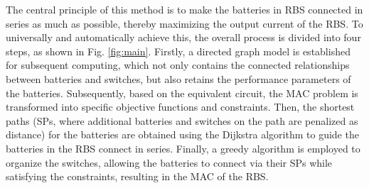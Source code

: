 \documentclass{article}
\begin{document}
The central principle of this method is to make the batteries in RBS connected in series as much as possible, thereby maximizing the output current of the RBS.
To universally and automatically achieve this, the overall process is divided into four steps, as shown in Fig. \ref{fig:main}.
Firstly, a directed graph model is established for subsequent computing, which not only contains the connected relationships between batteries and switches, but also retains the performance parameters of the batteries.
Subsequently, based on the equivalent circuit, the MAC problem is transformed into specific objective functions and constraints.
Then, the shortest paths (SPs, where additional batteries and switches on the path are penalized as distance) for the batteries are obtained using the Dijkstra algorithm to guide the batteries in the RBS connect in series.
Finally, a greedy algorithm is employed to organize the switches, allowing the batteries to connect via their SPs while satisfying the constraints, resulting in the MAC of the RBS.
\end{document}
